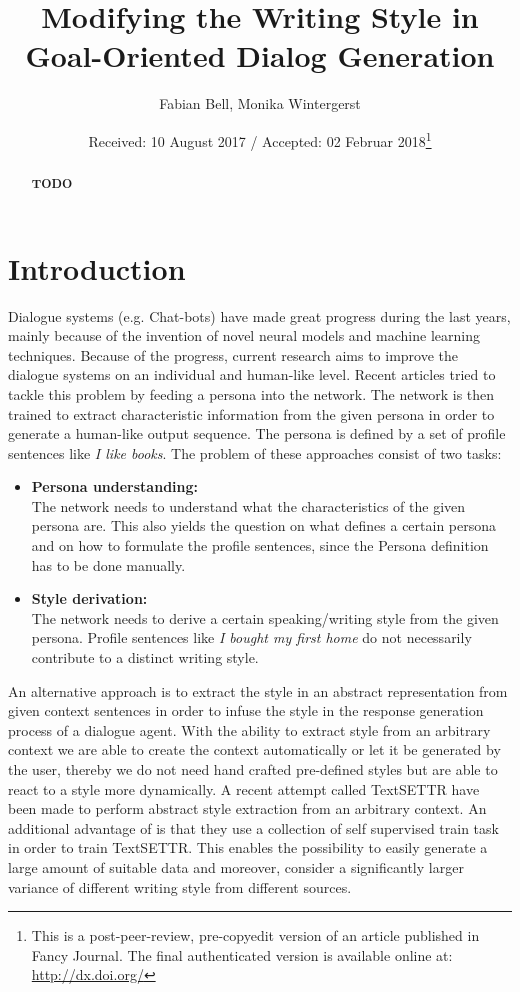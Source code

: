 \documentclass[twocolumn]{tum-article}
\title{Modifying the Writing Style in Goal-Oriented Dialog Generation}
\author{Fabian Bell\authormark{1,\Letter}\orcid{0000-0001-9595-4226},
  Monika Wintergerst\authormark{1}\orcid{0000-0002-9244-5431}}
\affil[1]{Department of Informatics, Technical University of Munich (TUM),
  Boltzmannstr. 3, 85748 Garching, Germany}
\date{Received: 10 August 2017 / Accepted: 02 Februar 2018\thanks{This is a
    post-peer-review, pre-copyedit version of an article published in Fancy
    Journal. The final authenticated version is available online at:
    \url{http://dx.doi.org/}}}
\begin{document}
\maketitle

\begin{abstract}
\textbf{TODO}
\end{abstract}

\section{Introduction}

Dialogue systems (e.g. Chat-bots) have made great progress during the last years, mainly because of the invention of novel neural models and machine learning techniques. Because of the progress, current research aims to improve the dialogue systems on an individual and human-like level. Recent articles \cite{DBLP:journals/corr/abs-1901-08149, liu2020impress} tried to tackle this problem by feeding a persona into the network. The network is then trained to extract characteristic information from the given persona in order to generate a human-like output sequence. The persona is defined by a set of profile sentences like \textit{I like books}. The problem of these approaches consist of two tasks:
\begin{itemize}
\item \textbf{Persona understanding:}\\
The network needs to understand what the characteristics of the given persona are. This also yields the question on what defines a certain persona and on how to formulate the profile sentences, since the Persona definition has to be done manually. 
\item \textbf{Style derivation:}\\
The network needs to derive a certain speaking/writing style from the given persona. Profile sentences like \textit{I bought my first home} \cite{liu2020impress} do not necessarily contribute to a distinct writing style.
\end{itemize}
An alternative approach is to extract the style in an abstract representation from given context sentences in order to infuse the style in the response generation process of a dialogue agent. With the ability to extract style from an arbitrary context we are able to create the context automatically or let it be generated by the user, thereby we do not need hand crafted pre-defined styles but are able to react to a style more dynamically. A recent attempt called TextSETTR \cite{riley2020textsettr} have been made to perform abstract style extraction from an arbitrary context. An additional advantage of \cite{riley2020textsettr} is that they use a collection of self supervised train task in order to train TextSETTR. This enables the possibility to easily generate a large amount of suitable data and moreover, consider a significantly larger variance of different writing style from different sources. 
\end{document}
